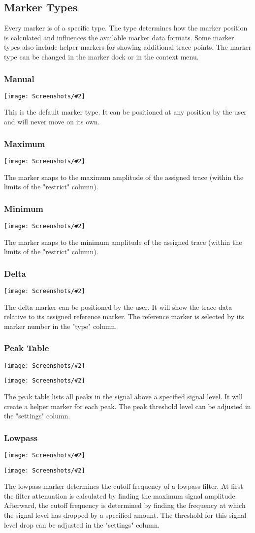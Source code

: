 \documentclass[a4paper,11pt]{article}
\newcommand{\screenshot}[2]{\begin{center}
\texttt{[image: Screenshots/\#2]}
\end{center}}
\begin{document}
\subsection{Marker Types}
\label{marker:types}
Every marker is of a specific type. The type determines how the marker position is calculated and influences the available marker data formats. Some marker types also include helper markers for showing additional trace points. The marker type can be changed in the marker dock or in the context menu.
\subsubsection{Manual}
\screenshot{1.0}{MarkerManual.png}
This is the default marker type. It can be positioned at any position by the user and will never move on its own.
\subsubsection{Maximum}
\screenshot{1.0}{MarkerMaximum.png}
The marker snaps to the maximum amplitude of the assigned trace (within the limits of the "restrict" column).
\subsubsection{Minimum}
\screenshot{1.0}{MarkerMinimum.png}
The marker snaps to the minimum amplitude of the assigned trace (within the limits of the "restrict" column).
\subsubsection{Delta}
\screenshot{1.0}{MarkerDelta}
The delta marker can be positioned by the user. It will show the trace data relative to its assigned reference marker. The reference marker is selected by its marker number in the "type" column.
\subsubsection{Peak Table}
\screenshot{1.0}{MarkerPeakGraph.png}
\screenshot{1.0}{MarkerPeakTable.png}
The peak table lists all peaks in the signal above a specified signal level. It will create a helper marker for each peak. The peak threshold level can be adjusted in the "settings" column.
\subsubsection{Lowpass}
\screenshot{1.0}{MarkerLowpassGraph.png}
\screenshot{1.0}{MarkerLowpassTable.png}
The lowpass marker determines the cutoff frequency of a lowpass filter. At first the filter attenuation is calculated by finding the maximum signal amplitude. Afterward, the cutoff frequency is determined by finding the frequency at which the signal level has dropped by a specified amount. The threshold for this signal level drop can be adjusted in the "settings" column.
\end{document}
